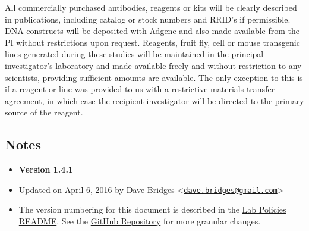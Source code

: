 All commercially purchased antibodies, reagents or kits will be clearly
described in publications, including catalog or stock numbers and RRID's
if permissible. DNA constructs will be deposited with Adgene and also
made available from the PI without restrictions upon request. Reagents,
fruit fly, cell or mouse transgenic lines generated during these studies
will be maintained in the principal investigator's laboratory and made
available freely and without restriction to any scientists, providing
sufficient amounts are available. The only exception to this is if a
reagent or line was provided to us with a restrictive materials transfer
agreement, in which case the recipient investigator will be directed to
the primary source of the reagent.

\subsection{Notes}\label{notes}

\begin{itemize}
\tightlist
\item
  \textbf{Version 1.4.1}
\item
  Updated on April 6, 2016 by Dave Bridges
  \textless{}\href{mailto:dave.bridges@gmail.com}{\nolinkurl{dave.bridges@gmail.com}}\textgreater{}
\item
  The version numbering for this document is described in the
  \href{https://github.com/BridgesLab/Lab-Documents/blob/master/Lab\%20Policies/README.rst}{Lab
  Policies README}. See the
  \href{https://github.com/BridgesLab/Lab-Documents/blob/master/Lab\%20Policies/data-resource-sharing.md}{GitHub
  Repository} for more granular changes.
\end{itemize}

